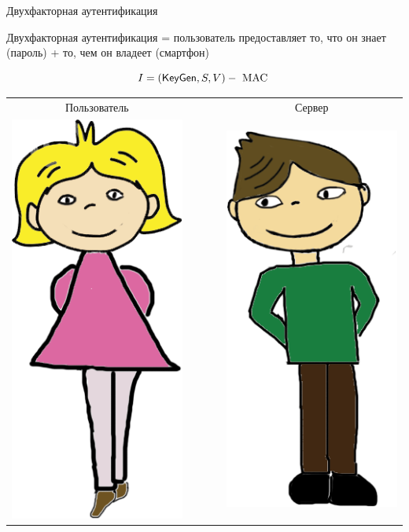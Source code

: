 \documentclass[usenames,dvipsnames,8pt,aspectratio=169]{beamer}
\begin{document}
\begin{frame}{Двухфакторная аутентификация}

\Large 
Двухфакторная аутентификация = пользователь предоставляет то, что он {\color{Orange} знает} (пароль) + то, чем он {\color{Orange} владеет} (смартфон) 

\[
I = (\textsf{KeyGen}, S, V) - \text{ MAC }  
\]

\vspace{10pt}
	\begin{tabular}{c c c c c}
		 Пользователь &  & &  & Сервер \\
		 \multirow{5}{*}{\includegraphics[scale=0.12]{Alice}} & & &
		 & \multirow{5}{*}{\includegraphics[scale=0.12]{Bob}}  \\

\end{tabular}
\end{frame}
\end{document}
